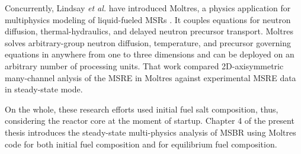 Concurrently, Lindsay \emph{et al.} have introduced Moltres, a physics application for multiphysics modeling of liquid-fueled \glspl{MSR} \cite{lindsay_introduction_2018}. It couples equations for neutron diffusion, thermal-hydraulics, and delayed neutron precursor transport. Moltres solves arbitrary-group neutron diffusion, temperature, and precursor governing equations in anywhere from one to three dimensions and can be deployed on an arbitrary number of processing units. That work compared 2D-axisymmetric many-channel anlysis of the \gls{MSRE} in Moltres against experimental \gls{MSRE} data in steady-state mode.

On the whole, these research efforts used initial fuel salt composition, thus, considering the reactor core at the moment of startup. Chapter 4 of the present thesis introduces the steady-state multi-physics analysis of \gls{MSBR} using Moltres code for both initial fuel composition and for equilibrium fuel composition.

